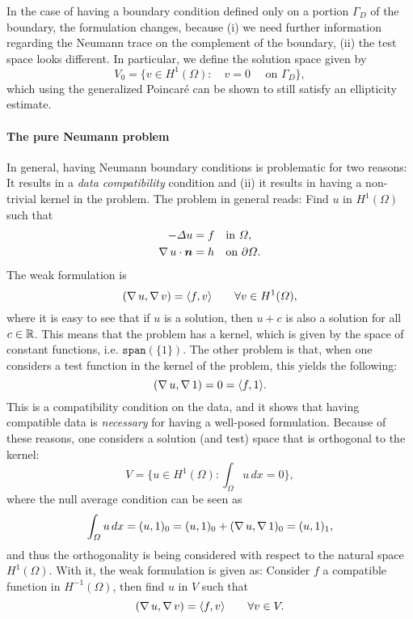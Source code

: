 In the case of having a boundary condition defined only on a portion $\Gamma_D$ of the boundary, the formulation changes, because (i) we need further information regarding the Neumann trace on the complement of the boundary, (ii) the test space looks different. In particular, we define the solution space given by 
    \begin{equation*}
V_0 = \{v\in H^1(\Omega): \quad v = 0 \quad\text{ on $\Gamma_D$}\},
\end{equation*}
which using the generalized Poincaré can be shown to still satisfy an ellipticity estimate. 

\paragraph{The pure Neumann problem} In general, having Neumann boundary conditions is problematic for two reasons: It results in a \emph{data compatibility} condition and (ii) it results in having a non-trivial kernel in the problem. The problem in general reads: Find $u$ in $H^1(\Omega)$ such that
    \begin{equation*}
\begin{aligned}
        -\Delta u &= f && \text{in $\Omega$},\\
        \grad u \cdot \vec n &= h && \text{on $\partial\Omega$}.
       \end{aligned}
\end{equation*}
The weak formulation is 
    \begin{equation*}
(\operatorname{\nabla} u, \operatorname{\nabla} v) = \langle f, v \rangle \qquad \forall v\in H^1(\Omega),
\end{equation*}
where it is easy to see that if $u$ is a solution, then $u+c$ is also a solution for all $c\in \mathbb{R}$. This means that the problem has a kernel, which is given by the space of constant functions, i.e. $\texttt{span}(\{1\})$. The other problem is that, when one considers a test function in the kernel of the problem, this yields the following: 
    \begin{equation*}
(\operatorname{\nabla} u, \operatorname{\nabla} 1) = 0 = \langle f, 1\rangle.
\end{equation*}
This is a compatibility condition on the data, and it shows that having compatible data is \emph{necessary} for having a well-posed formulation. Because of these reasons, one considers a solution (and test) space that is orthogonal to the kernel: 
    \begin{equation*}
V = \{u\in H^1(\Omega): \int_\Omega u \,dx = 0\},
\end{equation*}
where the null average condition can be seen as 
    \begin{equation*}
\int_\Omega u \,dx = (u, 1)_0 = (u,1)_0 + (\operatorname{\nabla} u, \operatorname{\nabla} 1)_0 = (u, 1)_1,
\end{equation*}
and thus the orthogonality is being considered with respect to the natural space $H^1(\Omega)$. With it, the weak formulation is given as: Consider $f$ a compatible function in $H^{-1}(\Omega)$, then find $u$ in $V$ such that
    \begin{equation*}
(\operatorname{\nabla} u, \operatorname{\nabla} v) = \langle f, v\rangle \qquad \forall v\in V.
\end{equation*}


